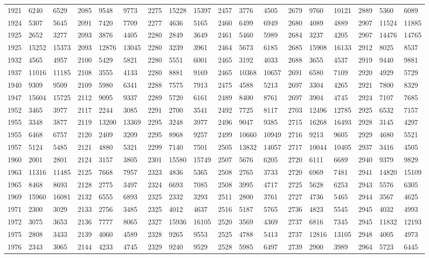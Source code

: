 \begin{center}
\begin{longtable}{*5{A@{\hspace*{5mm}}A}}
1921&6240&6529&2085&9548&9773&2275&15228&15397&2457&3776&4505&2679&9760&10121&2889&5360&6089\\
1924&5307&5645&2091&7420&7709&2277&4636&5165&2460&6499&6949&2680&4089&4889&2907&11524&11885\\
1925&2652&3277&2093&3876&4405&2280&2849&3649&2461&5460&5989&2684&3237&4205&2907&14476&14765\\
1925&15252&15373&2093&12876&13045&2280&3239&3961&2464&5673&6185&2685&15908&16133&2912&8025&8537\\
1932&4565&4957&2100&5429&5821&2280&5551&6001&2465&3192&4033&2688&3655&4537&2919&9440&9881\\
1937&11016&11185&2108&3555&4133&2280&8881&9169&2465&10368&10657&2691&6580&7109&2920&4929&5729\\
1940&9309&9509&2109&5980&6341&2288&7575&7913&2475&4588&5213&2697&3304&4265&2921&7800&8329\\
1947&15604&15725&2112&9095&9337&2289&5720&6161&2489&8400&8761&2697&3904&4745&2924&7107&7685\\
1952&3465&3977&2117&2244&3085&2291&2700&3541&2492&7725&8117&2703&12496&12785&2925&6532&7157\\
1955&3348&3877&2119&13200&13369&2295&3248&3977&2496&9047&9385&2715&16268&16493&2928&3145&4297\\
1955&6468&6757&2120&2409&3209&2295&8968&9257&2499&10660&10949&2716&9213&9605&2929&4680&5521\\
1957&5124&5485&2121&4880&5321&2299&7140&7501&2505&13832&14057&2717&10044&10405&2937&3416&4505\\
1960&2001&2801&2124&3157&3805&2301&15580&15749&2507&5676&6205&2720&6111&6689&2940&9379&9829\\
1963&11316&11485&2125&7668&7957&2323&4836&5365&2508&2765&3733&2720&6969&7481&2941&14820&15109\\
1965&8468&8693&2128&2775&3497&2324&6693&7085&2508&3995&4717&2725&5628&6253&2943&5576&6305\\
1969&15960&16081&2132&6555&6893&2325&2332&3293&2511&2800&3761&2727&4736&5465&2944&3567&4625\\
1971&2300&3029&2133&2756&3485&2325&4012&4637&2516&5187&5765&2736&4823&5545&2945&4032&4993\\
1972&3075&3653&2136&7777&8065&2327&15936&16105&2520&3569&4369&2737&6816&7345&2945&11832&12193\\
1975&2808&3433&2139&4060&4589&2328&9265&9553&2525&4788&5413&2737&12816&13105&2948&4005&4973\\
1976&2343&3065&2144&4233&4745&2329&9240&9529&2528&5985&6497&2739&2900&3989&2964&5723&6445\\

\end{longtable}
\end{center}
